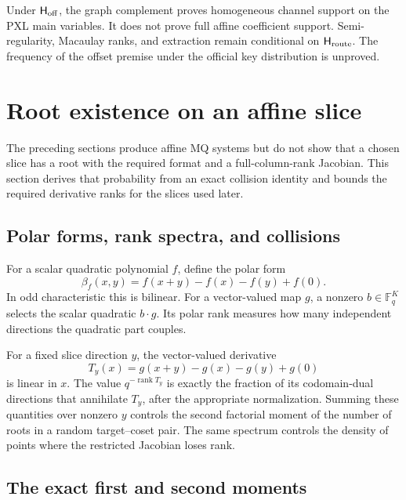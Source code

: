 \documentclass[11pt]{article}
\newcommand{\F}{\mathbb F}
\newcommand{\rank}{\operatorname{rank}}
\begin{document}
Under $\mathsf H_{\rm off}$, the graph complement proves homogeneous channel
support on the PXL main variables.  It does not prove full affine coefficient
support.  Semi-regularity, Macaulay ranks, and extraction remain conditional
on $\mathsf H_{\rm route}$.  The frequency of the offset premise under the
official key distribution is unproved.

\section{Root existence on an affine slice}
\label{sec:sq-full-domain-spectrum}

The preceding sections produce affine MQ systems but do not show that a chosen
slice has a root with the required format and a full-column-rank Jacobian.
This section derives that probability from an exact collision identity and
bounds the required derivative ranks for the slices used later.

\subsection{Polar forms, rank spectra, and collisions}
For a scalar quadratic polynomial $f$, define the polar form
\[
  \beta_f(x,y)=f(x+y)-f(x)-f(y)+f(0).
\]
In odd characteristic this is bilinear.  For a vector-valued map $g$, a
nonzero $b\in\F_q^K$ selects the scalar quadratic $b\cdot g$.  Its polar rank
measures how many independent directions the quadratic part couples.

For a fixed slice direction $y$, the vector-valued derivative
\begin{equation}
  T_y(x)=g(x+y)-g(x)-g(y)+g(0)
  \label{eq:sq-Ty}
\end{equation}
is linear in $x$.  The value $q^{-\rank T_y}$ is exactly the fraction of its
codomain-dual directions that annihilate $T_y$, after the appropriate
normalization.  Summing these quantities over nonzero $y$ controls the second
factorial moment of the number of roots in a random target--coset pair.  The
same spectrum controls the density of points where the restricted Jacobian
loses rank.

\subsection{The exact first and second moments}
\end{document}
